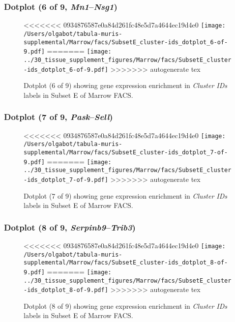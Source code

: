 \clearpage

\subsubsection{Dotplot (6 of 9, \emph{Mn1}--\emph{Nsg1})}
\begin{figure}[h]
\centering
<<<<<<< 0934876587e0a84d261fc48e5d7a4644ec19d4e0
\texttt{[image: /Users/olgabot/tabula-muris-supplemental/Marrow/facs/SubsetE\_cluster-ids\_dotplot\_6-of-9.pdf]}
=======
\texttt{[image: ../30\_tissue\_supplement\_figures/Marrow/facs/SubsetE\_cluster-ids\_dotplot\_6-of-9.pdf]}
>>>>>>> autogenerate tex

\caption{ Dotplot (6 of 9)  showing gene expression enrichment in \emph{Cluster IDs} labels in Subset E of Marrow FACS. }
\end{figure}


\clearpage

\subsubsection{Dotplot (7 of 9, \emph{Pask}--\emph{Sell})}
\begin{figure}[h]
\centering
<<<<<<< 0934876587e0a84d261fc48e5d7a4644ec19d4e0
\texttt{[image: /Users/olgabot/tabula-muris-supplemental/Marrow/facs/SubsetE\_cluster-ids\_dotplot\_7-of-9.pdf]}
=======
\texttt{[image: ../30\_tissue\_supplement\_figures/Marrow/facs/SubsetE\_cluster-ids\_dotplot\_7-of-9.pdf]}
>>>>>>> autogenerate tex

\caption{ Dotplot (7 of 9)  showing gene expression enrichment in \emph{Cluster IDs} labels in Subset E of Marrow FACS. }
\end{figure}


\clearpage

\subsubsection{Dotplot (8 of 9, \emph{Serpinb9}--\emph{Trib3})}
\begin{figure}[h]
\centering
<<<<<<< 0934876587e0a84d261fc48e5d7a4644ec19d4e0
\texttt{[image: /Users/olgabot/tabula-muris-supplemental/Marrow/facs/SubsetE\_cluster-ids\_dotplot\_8-of-9.pdf]}
=======
\texttt{[image: ../30\_tissue\_supplement\_figures/Marrow/facs/SubsetE\_cluster-ids\_dotplot\_8-of-9.pdf]}
>>>>>>> autogenerate tex

\caption{ Dotplot (8 of 9)  showing gene expression enrichment in \emph{Cluster IDs} labels in Subset E of Marrow FACS. }
\end{figure}


